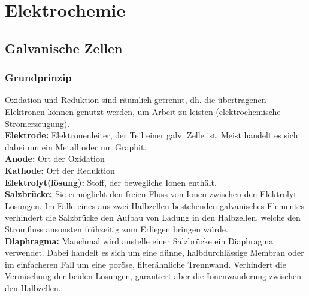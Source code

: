 \section{Elektrochemie}

\subsection{Galvanische Zellen}

\subsubsection{Grundprinzip}
Oxidation und Reduktion sind räumlich getrennt, dh. die übertragenen Elektronen können genutzt werden, um Arbeit zu leisten (elektrochemische Stromerzeugung).\\
\textbf{Elektrode:} Elektronenleiter, der Teil einer galv. Zelle ist. Meist handelt es sich dabei um ein Metall oder um Graphit.\\
\textbf{Anode:} Ort der Oxidation \\
\textbf{Kathode:} Ort der Reduktion \\
\textbf{Elektrolyt(lösung):} Stoff, der bewegliche Ionen enthält.\\
\textbf{Salzbrücke:} Sie ermöglicht den freien Fluss von Ionen zwischen den Elektrolyt-Lösungen. Im Falle eines aus zwei Halbzellen bestehenden galvanisches Elementes verhindert die Salzbrücke den Aufbau von Ladung in den Halbzellen, welche den Stromfluss ansonsten frühzeitig zum Erliegen bringen würde.\\
\textbf{Diaphragma:} Manchmal wird anstelle einer Salzbrücke ein Diaphragma verwendet. Dabei handelt es sich um eine dünne, halbdurchlässige Membran oder im einfacheren Fall um eine poröse, filterähnliche Trennwand. Verhindert die Vermischung der beiden Lösungen, garantiert aber die Ionenwanderung zwischen den Halbzellen.

